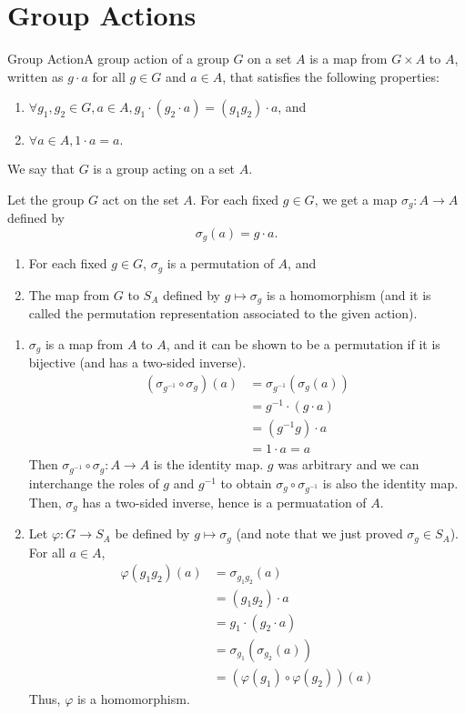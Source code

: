 \documentclass{report}
\newcommand{\mprop}[2]{\begin{Prop}{#1}{}#2\end{Prop}}
\newcommand{\dfn}[2]{\begin{Definition}[colbacktitle=red!75!black]{#1}{}#2\end{Definition}}
\newcommand{\nt}[1]{\begin{note}#1\end{note}}
\newenvironment{myproof}[1][\proofname]{%
	\proof[\bfseries #1: ]%
}{\endproof}
\begin{document}
\section{Group Actions}
\dfn{Group Action}{A group action of a group $G$ on a set $A$ is a map from $G \times A$ to $A$, written as $g \cdot a$ for all $g \in G$ and $a \in A$, that satisfies the following properties:
\begin{enumerate}
    \item $\forall g_1 , g_2 \in G, a \in A, g_1 \cdot (g_2 \cdot a) = (g_1 g_2)\cdot a$, and 
    \item $\forall a \in A, 1 \cdot a = a.$
\end{enumerate}}
\nt{We say that $G$ is a group acting on a set $A$.}
Let the group $G$ act on the set $A$. For each fixed $g \in G$, we get a map $\sigma_g : A \rightarrow A$ defined by 
$$\sigma_g (a) = g \cdot a.$$
\mprop{}{\begin{enumerate}
    \item For each fixed $g \in G$, $\sigma_g$ is a permutation of $A$, and 
    \item The map from $G$ to $S_A$ defined by $g \mapsto \sigma_g$ is a homomorphism (and it is called the permutation representation associated to the given action).
    \end{enumerate}} 
\begin{myproof}
    \begin{enumerate}
        \item $\sigma_g$ is a map from $A$ to $A$, and it can be shown to be a permutation if it is bijective (and has a two-sided inverse).     
        \begin{align*}
            (\sigma_{g^{-1}}\circ \sigma_g)(a) &= \sigma_{g^{-1}}(\sigma_g (a))\\
            &=g^{-1}\cdot(g \cdot a)\\
            &=(g^{-1}g)\cdot a\\
            &=1\cdot a=a
        \end{align*}
        Then $\sigma_{g^{-1}} \circ \sigma_g : A \rightarrow A$ is the identity map. $g$ was arbitrary and we can interchange the roles of $g$ and $g^{-1}$ to obtain $\sigma_g \circ \sigma_{g^{-1}}$ is also the identity map. Then, $\sigma_g$ has a two-sided inverse, hence is a permuatation of $A$. 
        \item Let $\varphi: G \rightarrow S_A$ be defined by $g \mapsto \sigma_g$ (and note that we just proved $\sigma_g \in S_A$). For all $a \in A$,
        \begin{align*}
            \varphi(g_1 g_2)(a) &= \sigma_{g_1 g_2}(a)\\
            &=(g_1 g_2)\cdot a\\
            &=g_1\cdot (g_2 \cdot a)\\
            &=\sigma_{g_1}(\sigma_{g_2} (a))\\
            &=(\varphi(g_1)\circ \varphi(g_2))(a)
        \end{align*}
        Thus, $\varphi$ is a homomorphism. 
    \end{enumerate}
\end{myproof}
\end{document}
